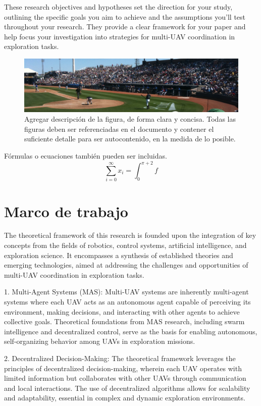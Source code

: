 \documentclass[sigconf]{acmart}
\begin{document}
    These research objectives and hypotheses set the direction for your study, outlining the specific goals you aim to achieve and the assumptions you'll test throughout your research. They provide a clear framework for your paper and help focus your investigation into strategies for multi-UAV coordination in exploration tasks.
    

\begin{figure}
  \includegraphics[width=.45\textwidth]{sample}
  \caption{Agregar descripción de la figura, de forma clara y concisa. Todas las figuras deben ser referenciadas en el documento y contener el suficiente detalle para ser autocontenido, en la medida de lo posible.}
  \label{figEjemplo}
\end{figure}

Fórmulas o ecuaciones también pueden ser incluidas.
\begin{equation}
  \sum_{i=0}^{\infty}x_i=\int_{0}^{\pi+2} f
\end{equation}

\section{Marco de trabajo}

The theoretical framework of this research is founded upon the integration of key concepts from the fields of robotics, control systems, artificial intelligence, and exploration science. It encompasses a synthesis of established theories and emerging technologies, aimed at addressing the challenges and opportunities of multi-UAV coordination in exploration tasks.

1. Multi-Agent Systems (MAS): Multi-UAV systems are inherently multi-agent systems where each UAV acts as an autonomous agent capable of perceiving its environment, making decisions, and interacting with other agents to achieve collective goals. Theoretical foundations from MAS research, including swarm intelligence and decentralized control, serve as the basis for enabling autonomous, self-organizing behavior among UAVs in exploration missions.

2. Decentralized Decision-Making: The theoretical framework leverages the principles of decentralized decision-making, wherein each UAV operates with limited information but collaborates with other UAVs through communication and local interactions. The use of decentralized algorithms allows for scalability and adaptability, essential in complex and dynamic exploration environments.
\end{document}
